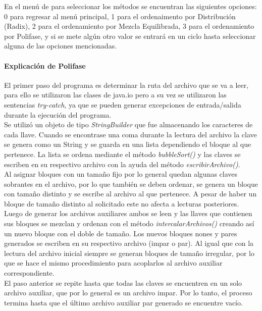 \documentclass{article}
\begin{document}
	En el menú de para seleccionar los métodos se encuentran las siguientes opciones: 0 para regresar al menú principal, 1 para el ordenaimento por
	Distribución (Radix), 2 para el ordenamiento por Mezcla Equilibrada, 3 para el ordenamiento por Polifase, y si se mete algún otro valor se
	entrará en un ciclo hasta seleccionar alguna de las opciones mencionadas.
	
	\paragraph*{Explicación de Polifase}
	El primer paso del programa es determinar la ruta del archivo que se va a leer, para ello se utilizaron las clases de java.io pero a su vez
	se utilizaron las sentencias \textit{try-catch}, ya que se pueden generar excepciones de entrada/salida durante la ejecución del programa.\\
	
	Se utilizó un objeto de tipo \textit{StringBuilder} que fue almacenando los caracteres de cada llave. Cuando se encontrase una coma durante 
	la lectura del archivo la clave se genera como un String y se guarda en una lista dependiendo el bloque al que pertenece. La lista se ordena 
	mediante el método \textit{bubbleSort()} y las claves se escriben en su respectivo archivo con la ayuda del método \textit{escribirArchivo()}.\\
	
	Al asignar bloques con un tamaño fijo por lo general quedan algunas claves sobrantes en el archivo, por lo que también se deben ordenar, se 
	genera un bloque con tamaño distinto y se escribe al archivo al que pertenece. A pesar de haber un bloque de tamaño distinto al solicitado este 
	no afecta a lecturas posteriores.\\
	
	Luego de generar los archivos auxiliares ambos se leen y las llaves que contienen sus bloques se mezclan y ordenan con el método \textit{intercalarArchivos()} 
	creando así un nuevo bloque con el doble de tamaño. Los nuevos bloques nones y pares generados se escriben en su respectivo archivo (impar o par). 
	Al igual que con la lectura del archivo inicial siempre se generan bloques de tamaño irregular, por lo que se hace el mismo procedimiento para acoplarlos 
	al archivo auxiliar correspondiente.\\
	
	El paso anterior se repite hasta que todas las claves se encuentren en un solo archivo auxiliar, que por lo general es un archivo impar. 
	Por lo tanto, el proceso termina hasta que el último archivo auxiliar par generado se encuentre vacío.
	
\end{document}

